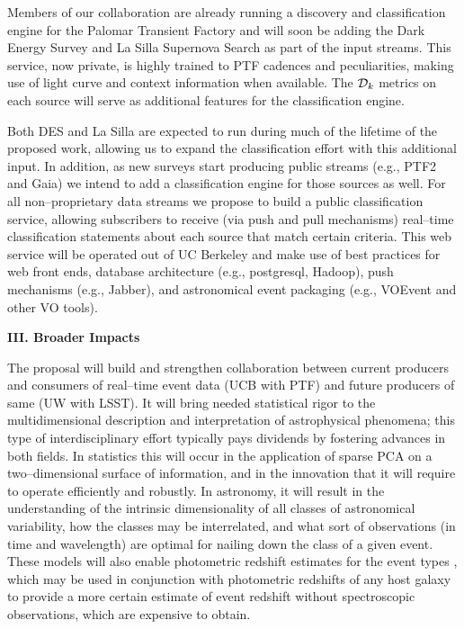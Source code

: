  \smallskip

Members of our collaboration are already running a discovery and classification
engine for the Palomar Transient Factory and will soon be adding the Dark Energy
Survey and La Silla Supernova Search as part of the input streams.  This
service, now private, is highly trained to PTF cadences and peculiarities,
making use of light curve and context information when available. The ${\cal
D}_k$ metrics on each source will serve as additional features for the
classification engine.

Both DES and La Silla are expected to run during much of the lifetime of the
proposed work, allowing us to expand the classification effort with this
additional input. In addition, as new surveys start producing public streams
(e.g., PTF2 and Gaia) we intend to add a classification engine for those sources
as well.  For all non--proprietary data streams we propose to build a public
classification service, allowing subscribers to receive (via push and pull
mechanisms) real--time classification statements about each source that match
certain criteria. This web service will be operated out of UC Berkeley and make
use of best practices for web front ends, database architecture (e.g.,
postgresql, Hadoop), push mechanisms (e.g., Jabber), and astronomical event
packaging (e.g., VOEvent and other VO tools).

\bigskip \centerline{\bf III. Broader Impacts} \smallskip

The proposal will build and strengthen collaboration between current producers
and consumers of real--time event data (UCB with PTF) and future producers of
same (UW with LSST).  It will bring needed statistical rigor to the
multidimensional description and interpretation of astrophysical phenomena; this
type of interdisciplinary effort typically pays dividends by fostering advances
in both fields.  In statistics this will occur in the application of sparse PCA
on a two--dimensional surface of information, and in the innovation that it will
require to operate efficiently and robustly.  In astronomy, it will result in
the understanding of the intrinsic dimensionality of all classes of astronomical
variability, how the classes may be interrelated, and what sort of observations
(in time and wavelength) are optimal for nailing down the class of a given
event.  These models will also enable photometric redshift estimates for the
event types \citep[e.g.][]{2010ApJ...717...40K}, which may be used in
conjunction with photometric redshifts of any host galaxy
\citep[e.g.][]{1962IAUS...15..390B} to provide a more certain estimate of event
redshift without spectroscopic observations, which are expensive to obtain.

